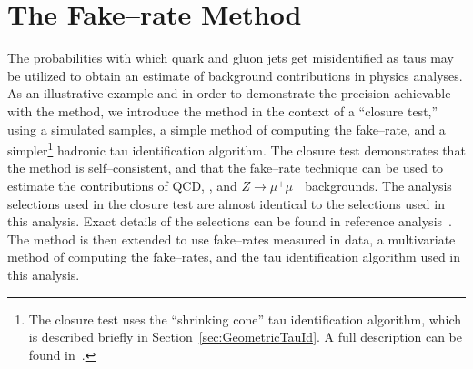 \section{The Fake--rate Method}
\label{sec:fakerate}
%
The probabilities with which quark and gluon jets get misidentified as taus
may be utilized to obtain an estimate of background contributions in physics
analyses.  As an illustrative example and in order to demonstrate the precision
achievable with the method, we introduce the method in the context of a
``closure test,'' using a simulated samples, a simple method of computing the
fake--rate, and a simpler\footnote{The closure test uses the ``shrinking cone''
tau identification algorithm, which is described briefly in
Section~\ref{sec:GeometricTauId}. A full description can be found
in~\cite{CMS-PAS-PFT-08-001}.} hadronic tau identification algorithm.  The
closure test demonstrates that the method is self--consistent, and that the
fake--rate technique can be used to estimate the contributions of QCD, \WpJets,
\ttbarpJets and $Z \rightarrow \mu^{+} \mu^{-}$ backgrounds.   The analysis
selections used in the closure test are almost identical to the selections used
in this analysis.  Exact details of the selections can be found in reference
analysis~\cite{CMS-PAS-EWK-10-002}.  The method is then extended to use
fake--rates measured in data, a multivariate method of computing the
fake--rates, and the \hpsTanc tau identification algorithm used in this
analysis.

